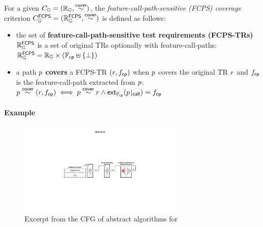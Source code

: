\begin{definition}\label{def:fcps-cov}
  For a given $C_{\mathbb{G}} = (\mathbb{R}_{\mathbb{G}}, \overset{\textsf{cover}}{\sim})$, the
  \textit{feature-call-path-sensitive (FCPS) coverage} criterion $C_{\mathbb{G}}^{\textsf{FCPS}}
  = (\mathbb{R}_{\mathbb{G}}^{\textsf{FCPS}}, \overset{\textsf{cover}}{\sim})$ is defined as follows:
  \begin{itemize}
    \item the set of \textbf{feature-call-path-sensitive test requirements
      (FCPS-TRs)} $\mathbb{R}_{\mathbb{G}}^{\textsf{FCPS}}$ is a set of original TRs optionally with
      feature-call-paths:
$
        \mathbb{R}_{\mathbb{G}}^{\textsf{FCPS}} = \mathbb{R}_{\mathbb{G}} \times (\mathbb{F}_{\textsf{cp}} \uplus \{ \bot \})
$
    \item a path $p$ \textbf{covers} a FCPS-TR $(r, f_{\textsf{cp}})$ when $p$
      covers the original TR $r$ and $f_{\textsf{cp}}$ is the feature-call-path extracted
      from $p$:
$
        p \overset{\textsf{cover}}{\sim} (r, f_{\textsf{cp}}) \iff p \overset{\textsf{cover}}{\sim} r \wedge
        \textsf{ext}_{\mathbb{F}_{\textsf{cp}}}({p}\!\mid_{\textsf{call}}) = f_{\textsf{cp}}
$
  \end{itemize}
\end{definition}


\paragraph{\textbf{Example}}

\begin{figure}
  \includegraphics[width=0.7\textwidth]{img/spec-cfg-id}
\vspace*{-.5em}
  \caption{
Excerpt from the CFG of abstract algorithms for 
  }
  \label{fig:spec-cfg-id}
\vspace*{-1em}
\end{figure}

